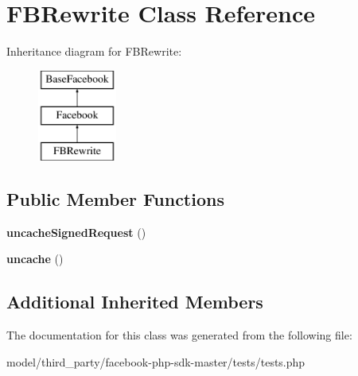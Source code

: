 \hypertarget{classFBRewrite}{\section{F\-B\-Rewrite Class Reference}
\label{classFBRewrite}
}
Inheritance diagram for F\-B\-Rewrite\-:\begin{figure}[H]
\begin{center}
\leavevmode
\includegraphics[height=3.000000cm]{classFBRewrite}
\end{center}
\end{figure}
\subsection*{Public Member Functions}
\begin{DoxyCompactItemize}
\item 
\hypertarget{classFBRewrite_a0ce100223cb3782f94b06e5b5551f98e}{{\bfseries uncache\-Signed\-Request} ()}\label{classFBRewrite_a0ce100223cb3782f94b06e5b5551f98e}

\item 
\hypertarget{classFBRewrite_a70a1774d26f5421f838d93bd9994a7a2}{{\bfseries uncache} ()}\label{classFBRewrite_a70a1774d26f5421f838d93bd9994a7a2}

\end{DoxyCompactItemize}
\subsection*{Additional Inherited Members}


The documentation for this class was generated from the following file\-:\begin{DoxyCompactItemize}
\item 
model/third\-\_\-party/facebook-\/php-\/sdk-\/master/tests/tests.\-php\end{DoxyCompactItemize}
